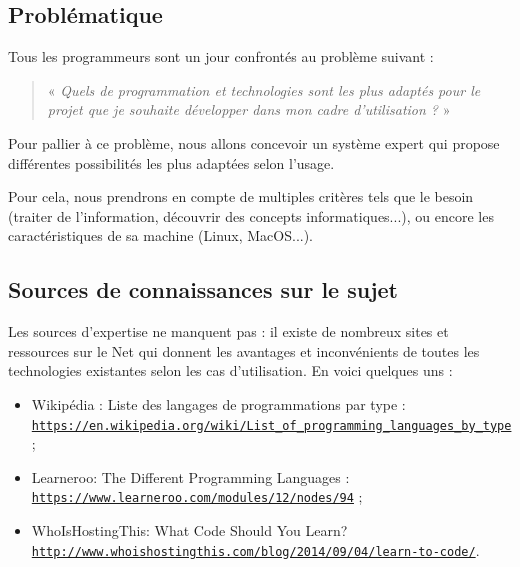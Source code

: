 \documentclass[a4paper,12pt]{article}
\begin{document}
\subsection{Problématique}

Tous les programmeurs sont un jour confrontés au problème suivant :

\begin{quotation}
\centering
« \textit{Quels de programmation et technologies sont les plus adaptés pour le projet que je souhaite développer dans mon cadre d'utilisation ?} »

\end{quotation}


    Pour pallier à ce problème, nous allons concevoir un système expert qui propose différentes possibilités les plus adaptées selon l'usage.

    Pour cela, nous prendrons en compte de multiples critères tels que le besoin (traiter de l'information, découvrir des concepts informatiques...), ou encore les caractéristiques de sa machine (Linux, MacOS...).

\subsection{Sources de connaissances sur le sujet}

    Les sources d'expertise ne manquent pas : il existe de nombreux sites et ressources sur le Net qui donnent les avantages et inconvénients de toutes les technologies existantes selon les cas d'utilisation. En voici quelques uns :
    \begin{itemize}
        \item Wikipédia : Liste des langages de programmations par type :\\ \href{https://en.wikipedia.org/wiki/List_of_programming_languages_by_type}{\texttt{https://en.wikipedia.org/wiki/List\_of\_programming\_languages\_by\_type}} ;
        \item Learneroo: The Different Programming Languages :\\ \href{https://www.learneroo.com/modules/12/nodes/94}{\texttt{https://www.learneroo.com/modules/12/nodes/94}} ;
        \item WhoIsHostingThis: What Code Should You Learn?\\ \href{http://www.whoishostingthis.com/blog/2014/09/04/learn-to-code/}{\texttt{http://www.whoishostingthis.com/blog/2014/09/04/learn-to-code/}}.
    \end{itemize}
\end{document}
